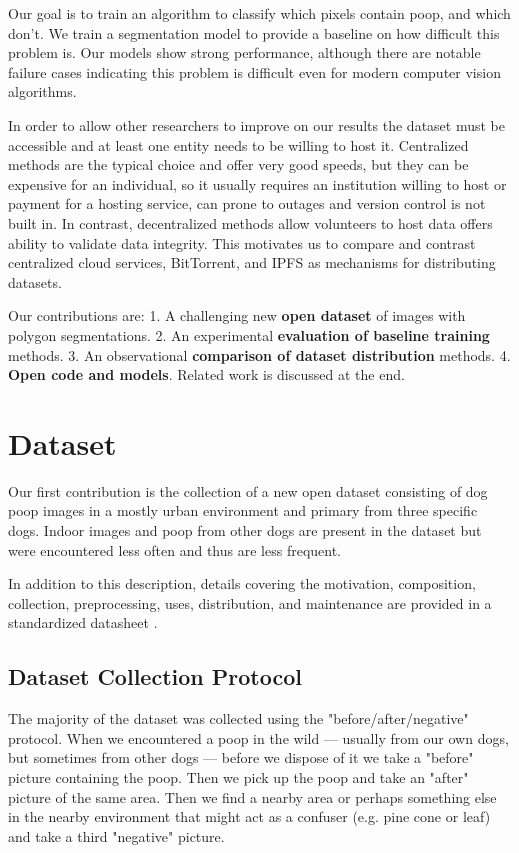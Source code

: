 \documentclass[10pt,twocolumn,letterpaper]{article}
\begin{document}
Our goal is to train an algorithm to classify which pixels contain poop, and
which don't. We train a segmentation model to provide a baseline on how
difficult this problem is. Our models show strong performance, although there
are notable failure cases indicating this problem is difficult even for modern
computer vision algorithms.

In order to allow other researchers to improve on our results the dataset must
be accessible and at least one entity needs to be willing to host it.
Centralized methods are the typical choice and offer very good speeds, 
but they can be expensive for an individual, so it usually requires an
institution willing to host or payment for a hosting service,
can prone to outages and version control is not built in.
In contrast, decentralized methods allow volunteers to host data offers ability
to validate data integrity. 
This motivates us to compare and contrast centralized cloud services,
BitTorrent, and IPFS as mechanisms for distributing datasets.



Our contributions are:
1. A challenging new \textbf{open dataset} of images with polygon segmentations.
2. An experimental \textbf{evaluation of baseline training} methods.
3. An observational \textbf{comparison of dataset distribution} methods.
4. \textbf{Open code and models}.
Related work is discussed at the end.


\section{Dataset}

Our first contribution is the collection of a new open dataset consisting of
dog poop images in a mostly urban environment and primary from three specific
dogs. Indoor images and poop from other dogs are present in the dataset but
were encountered less often and thus are less frequent.

In addition to this description, details covering the motivation, composition,
collection, preprocessing, uses, distribution, and maintenance are provided in
a standardized datasheet \cite{gebru_datasheets_2021}.

\subsection{Dataset Collection Protocol}
The majority of the dataset was collected using the "before/after/negative"
protocol.
When we encountered a poop in the wild --- usually from our own dogs, but
sometimes from other dogs --- before we dispose of it we 
take a "before" picture containing the poop.
Then we pick up the poop and take an "after" picture of the same area. 
Then we find a nearby area or perhaps something else in the nearby environment
that might act as a confuser (e.g. pine cone or leaf) and take a third
"negative" picture.
\end{document}
